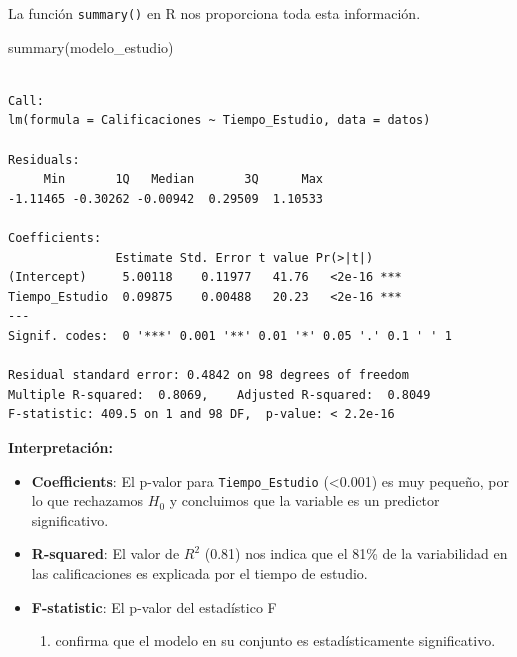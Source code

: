 \documentclass[
  letterpaper,
  DIV=11,
  numbers=noendperiod]{scrreprt}
\newenvironment{Shaded}{\begin{snugshade}}{\end{snugshade}}
\newcommand{\FunctionTok}[1]{\textcolor[rgb]{0.28,0.35,0.67}{#1}}
\newcommand{\NormalTok}[1]{\textcolor[rgb]{0.00,0.23,0.31}{#1}}
\providecommand{\tightlist}{%
  \setlength{\itemsep}{0pt}\setlength{\parskip}{0pt}}
\begin{document}
\begin{tcolorbox}[enhanced jigsaw, leftrule=.75mm, breakable, colbacktitle=quarto-callout-tip-color!10!white, bottomrule=.15mm, colframe=quarto-callout-tip-color-frame, toprule=.15mm, colback=white, coltitle=black, bottomtitle=1mm, left=2mm, title=\textcolor{quarto-callout-tip-color}{\faLightbulb}\hspace{0.5em}{Ejemplo: Interpretación del \texttt{summary}}, opacityback=0, arc=.35mm, opacitybacktitle=0.6, toptitle=1mm, titlerule=0mm, rightrule=.15mm]

La función \texttt{summary()} en R nos proporciona toda esta
información.

\begin{Shaded}
\begin{Highlighting}[]
\FunctionTok{summary}\NormalTok{(modelo\_estudio)}
\end{Highlighting}
\end{Shaded}

\begin{verbatim}

Call:
lm(formula = Calificaciones ~ Tiempo_Estudio, data = datos)

Residuals:
     Min       1Q   Median       3Q      Max 
-1.11465 -0.30262 -0.00942  0.29509  1.10533 

Coefficients:
               Estimate Std. Error t value Pr(>|t|)    
(Intercept)     5.00118    0.11977   41.76   <2e-16 ***
Tiempo_Estudio  0.09875    0.00488   20.23   <2e-16 ***
---
Signif. codes:  0 '***' 0.001 '**' 0.01 '*' 0.05 '.' 0.1 ' ' 1

Residual standard error: 0.4842 on 98 degrees of freedom
Multiple R-squared:  0.8069,    Adjusted R-squared:  0.8049 
F-statistic: 409.5 on 1 and 98 DF,  p-value: < 2.2e-16
\end{verbatim}

\textbf{Interpretación:}

\begin{itemize}
\tightlist
\item
  \textbf{Coefficients}: El p-valor para \texttt{Tiempo\_Estudio}
  (\textless0.001) es muy pequeño, por lo que rechazamos \(H_0\) y
  concluimos que la variable es un predictor significativo.
\item
  \textbf{R-squared}: El valor de \(R^2\) (0.81) nos indica que el 81\%
  de la variabilidad en las calificaciones es explicada por el tiempo de
  estudio.
\item
  \textbf{F-statistic}: El p-valor del estadístico F

  \begin{enumerate}
  \def\labelenumi{(\arabic{enumi})}
  \setcounter{enumi}{97}
  \tightlist
  \item
    confirma que el modelo en su conjunto es estadísticamente
    significativo.
  \end{enumerate}
\end{itemize}

\end{tcolorbox}
\end{document}
